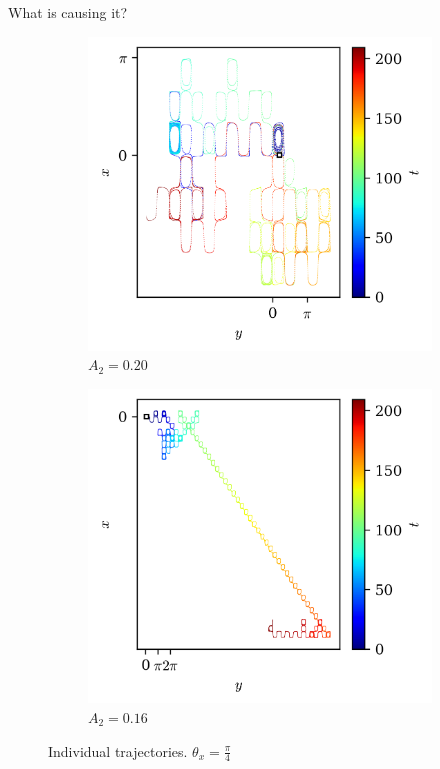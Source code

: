 \documentclass[10pt]{beamer}
\begin{document}
\begin{frame}{What is causing it?}

    \begin{figure}
        \begin{subfigure}[b]{0.45\textwidth}
            \includegraphics[width=\textwidth]{graf_2ondas/anom1_traj.png}
            \caption{$A_2 = 0.20$}
        \end{subfigure}
        \begin{subfigure}[b]{0.45\textwidth}
            \includegraphics[width=\textwidth]{graf_2ondas/anom2_traj.png}
            \caption{$A_2 = 0.16$}
        \end{subfigure}

        \caption{Individual trajectories. $\theta_x = \frac{\pi}{4}$}
    \end{figure}
    
\end{frame}
\end{document}
